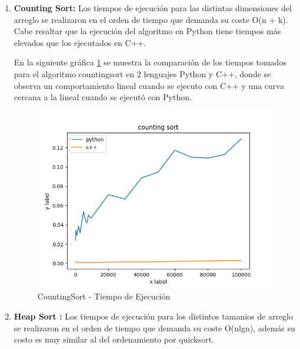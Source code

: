 \documentclass{article}
\begin{document}
\begin{enumerate}
		                \item \textbf{Counting Sort: }
		                Los tiempos de ejecución para las distintas dimensiones del arreglo se realizaron  en el orden de tiempo que demanda su coste O(n + k). Cabe resaltar que la ejecución del algoritmo en Python tiene tiempos más elevados que los ejecutados en C++.
                            
                            
                            
                            
                            
                            En la siguiente gráfica \ref{fig:counting_diagram} se muestra la comparación de los tiempos tomados para el algoritmo countingsort en 2 lenguajes Python y C++, donde se observa un comportamiento lineal cuando se ejecuto con C++ y una curva cercana a la lineal cuando se ejecutó con Python.
                            
                            \begin{figure}[H]
                                \centering
                                \includegraphics[scale=0.6]{img/counting_diagram.png}
                                \caption{CountingSort - Tiempo de Ejecución}
                                \label{fig:counting_diagram}
                            \end{figure}
		                \item \textbf{Heap Sort :}
                            Los tiempos de ejecución para los distintos tamanios de arreglo se realizaron  en el orden de tiempo que demanda su coste O(nlgn), además su costo es muy similar al del ordenamiento por quicksort.
                            

\end{enumerate}
\end{document}
